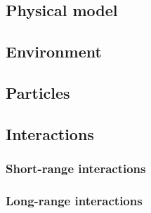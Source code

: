 \documentclass[a4paper, 12pt]{article}
\def\buildMode{buildmissing}
\begin{document}
    \begin{landscape}
    \section{Physical model}

        \subsection{Environment}

        \begin{figure}[htb]
            \centering
            
            \caption{}
        \end{figure}
        \clearpage

        \subsection{Particles}

        \begin{figure}[htb]
            \centering
            
            \caption{}
        \end{figure}
        \clearpage

        \subsection{Interactions}

            \subsubsection{Short-range interactions}
            \begin{figure}[htb]
                \centering
                
                \caption{}
            \end{figure}

    \end{landscape}
        \clearpage
        \thispagestyle{empty}
        \recalctypearea

            \subsubsection{Long-range interactions}
            \begin{figure}[htb]
                \centering
                
                \caption{}
            \end{figure}
\end{document}
